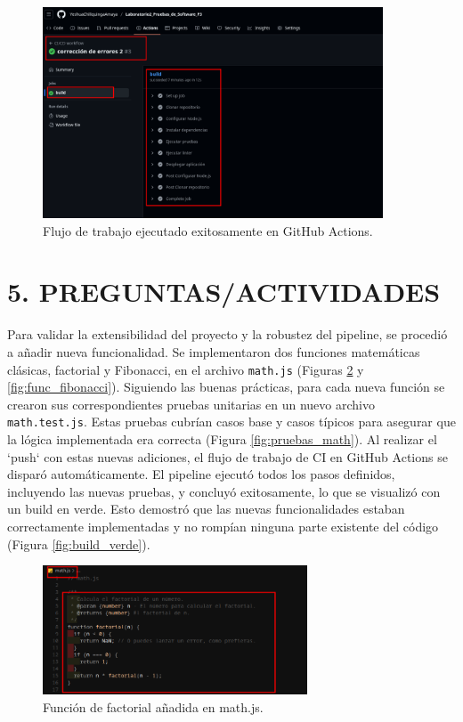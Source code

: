 \documentclass[12pt, a4paper]{article}
\begin{document}
\begin{figure}[H]
    \centering
    \includegraphics[width=0.9\textwidth]{img/podemos ver el flujo de trabajo en verde indicando que todo salio correctamente pero si sale en rojo podemos identificar que algo fallo en algunas de las pruebas.png}
    \caption{Flujo de trabajo ejecutado exitosamente en GitHub Actions.}
    \label{fig:workflow_verde}
\end{figure}

\section*{5. PREGUNTAS/ACTIVIDADES}
Para validar la extensibilidad del proyecto y la robustez del pipeline, se procedi\'o a a\~nadir nueva funcionalidad. Se implementaron dos funciones matem\'aticas cl\'asicas, factorial y Fibonacci, en el archivo \texttt{math.js} (Figuras \ref{fig:func_factorial} y \ref{fig:func_fibonacci}). Siguiendo las buenas pr\'acticas, para cada nueva funci\'on se crearon sus correspondientes pruebas unitarias en un nuevo archivo \texttt{math.test.js}. Estas pruebas cubr\'ian casos base y casos t\'ipicos para asegurar que la l\'ogica implementada era correcta (Figura \ref{fig:pruebas_math}). Al realizar el `push` con estas nuevas adiciones, el flujo de trabajo de CI en GitHub Actions se dispar\'o autom\'aticamente. El pipeline ejecut\'o todos los pasos definidos, incluyendo las nuevas pruebas, y concluy\'o exitosamente, lo que se visualiz\'o con un build en verde. Esto demostr\'o que las nuevas funcionalidades estaban correctamente implementadas y no romp\'ian ninguna parte existente del c\'odigo (Figura \ref{fig:build_verde}).

\begin{figure}[H]
    \centering
    \includegraphics[width=0.7\textwidth]{img/nueva funcion en mathjs la de factorial.png}
    \caption{Funci\'on de factorial a\~nadida en math.js.}
    \label{fig:func_factorial}
\end{figure}
\end{document}
